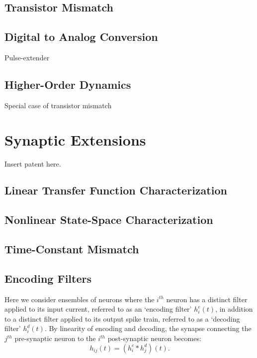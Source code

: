 \subsection{Transistor Mismatch}

\subsection{Digital to Analog Conversion}

Pulse-extender

\subsection{Higher-Order Dynamics}

Special case of transistor mismatch


\section{Synaptic Extensions}

Insert patent here.

\subsection{Linear Transfer Function Characterization}

\subsection{Nonlinear State-Space Characterization}

\subsection{Time-Constant Mismatch}

\subsection{Encoding Filters}

Here we consider ensembles of neurons where the $i^{th}$ neuron has a distinct filter applied to its input current, referred to as an `encoding filter' $h^e_i(t)$, in addition to a distinct filter applied to its output spike train, referred to as a `decoding filter' $h^d_i(t)$. 
By linearity of encoding and decoding, the synapse connecting the $j^{th}$ pre-synaptic neuron to the $i^{th}$ post-synaptic neuron becomes:
\begin{equation} \label{eq:syn-factored}
h_{ij}(t) = (h^e_i \ast h^d_j)(t) .
\end{equation}

